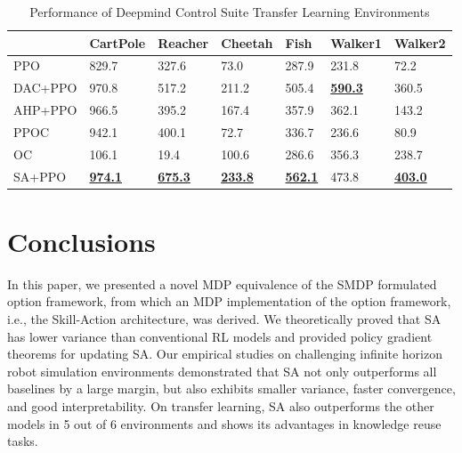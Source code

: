 \begin{table}[h]
\caption{Performance of Deepmind Control Suite Transfer Learning Environments}
\label{table:transfer}
\begin{center}
\begin{tabular}{|l|l|l|l|l|l|l|}
\hline
        & CartPole             & Reacher              & Cheetah              & Fish                 & Walker1              & Walker2              \\ \hline
PPO     & 829.7                & 327.6                & 73.0                 & 287.9                & 231.8                & 72.2                 \\ \hline
DAC+PPO & 970.8                & 517.2                & 211.2                & 505.4                & {\ul \textbf{590.3}} & 360.5                \\ \hline
AHP+PPO & 966.5                & 395.2                & 167.4                & 357.9                & 362.1                & 143.2                \\ \hline
PPOC    & 942.1                & 400.1                & 72.7                 & 336.7                & 236.6                & 80.9                 \\ \hline
OC      & 106.1                & 19.4                 & 100.6                & 286.6                & 356.3                & 238.7                \\ \hline
SA+PPO  & {\ul \textbf{974.1}} & {\ul \textbf{675.3}} & {\ul \textbf{233.8}} & {\ul \textbf{562.1}} & 473.8                & {\ul \textbf{403.0}} \\ \hline
\end{tabular}
\end{center}
\end{table}

\section{Conclusions}
\label{sec:conclusion}

In this paper, we presented a novel MDP equivalence of the SMDP
formulated option framework, from which an MDP implementation of
the option framework, i.e., the Skill-Action architecture, was
derived. We theoretically proved that SA has lower variance than
conventional RL models and provided policy gradient theorems for
updating SA. Our empirical studies on challenging infinite
horizon robot simulation environments demonstrated that SA not
only outperforms all baselines by a large margin, but also
exhibits smaller variance, faster convergence, and good
interpretability. On transfer learning, SA also outperforms the
other models in 5 out of 6 environments and shows its advantages
in knowledge reuse tasks.

